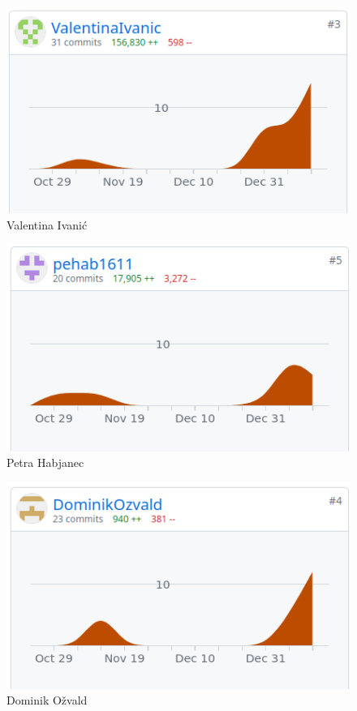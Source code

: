 		\begin{figure}[H]
			\includegraphics[scale=0.45]{slike/valentina_git.png} 
			\centering
			\caption{Valentina Ivanić}
			\label{fig:id2}
		\end{figure}
		\begin{figure}[H]
			\includegraphics[scale=0.45]{slike/petra_git.png} 
			\centering
			\caption{Petra Habjanec}
			\label{fig:id3}
		\end{figure}
		\begin{figure}[H]
			\includegraphics[scale=0.45]{slike/dominik_git.png} 
			\centering
			\caption{Dominik Ožvald}
			\label{fig:id4}
		\end{figure}